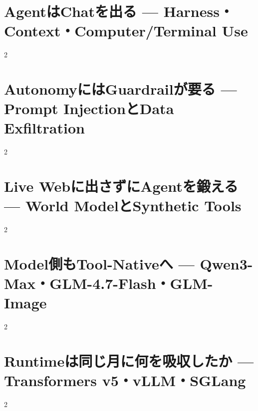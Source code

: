 \documentclass[lualatex,a4paper,11pt]{jlreq}
\begin{document}
\surveycover
\clearpage


\clearpage
\section{AgentはChatを出る — Harness・Context・Computer/Terminal Use}
\label{pkg:agent-stack-leaves-chat}

\medskip
\begin{multicols}{2}

\end{multicols}


\clearpage
\section{AutonomyにはGuardrailが要る — Prompt InjectionとData Exfiltration}
\label{pkg:autonomy-needs-guardrails}

\medskip
\begin{multicols}{2}

\end{multicols}


\clearpage
\section{Live Webに出さずにAgentを鍛える — World ModelとSynthetic Tools}
\label{pkg:training-agents-offline}

\medskip
\begin{multicols}{2}

\end{multicols}


\clearpage
\section{Model側もTool-Nativeへ — Qwen3-Max・GLM-4.7-Flash・GLM-Image}
\label{pkg:tool-native-models}

\medskip
\begin{multicols}{2}

\end{multicols}


\clearpage
\section{Runtimeは同じ月に何を吸収したか — Transformers v5・vLLM・SGLang}
\label{pkg:runtime-catches-the-agent-wave}

\medskip
\begin{multicols}{2}

\end{multicols}

\end{document}

